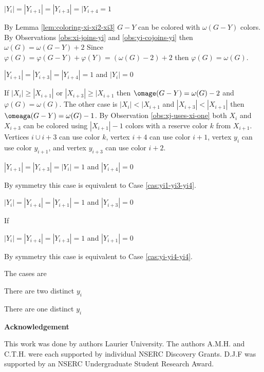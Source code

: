 \documentclass[12pt]{article}
\begin{document}
\begin{Case}\label{obs:four-yi} 
$|Y_i| = |Y_{i+1}| = |Y_{i+3}| = |Y_{i+4} =  1$
\end{Case}
 By Lemma \ref{lem:coloring-xi-xi2-xi3} $G - Y$ can be colored with $\omega(G - Y)$ colors. By Observations \ref{obs:xi-joins-yi} and \ref{obs:yi-cojoins-yi} then $\omega(G) = \omega(G - Y) + 2$ Since $\varphi(G) = \varphi(G - Y) + \varphi(Y) = (\omega(G) - 2) + 2$ then $\varphi(G) = \omega(G)$.

\begin{Case}\label{cas:yi1-yi3-yi4} 
$|Y_{i+1}| = |Y_{i+3}| =  |Y_{i+4}| = 1$ and $|Y_{i}| = 0$
\end{Case}
 If $|X_i| \geq |X_{i+1}|$ or $|X_{i+3}| \geq |X_{i+1}$ then $\omage(G - Y) = \omega(G) - 2$ and $\varphi(G) = \omega(G)$. The other case is $|X_i| < |X_{i+1}$ and $|X_{i+3}| < |X_{i+1}|$ then $\omeaga(G- Y) = \omega(G) - 1$. By Observation \ref{obs:xj-uses-xi-one} both $X_{i}$ and $X_{i+3}$ can be colored using $|X_{i+1}| - 1$ colors with a reserve color $k$ from $X_{i+1}$. Vertices $i \cup i+3$ can use color $k$, vertex $i+4$ can use color $i+1$, vertex $y_i$ can use color $y_{i+1}$, and vertex $y_{i+3}$ can use color $i+2$. 

\begin{Case}\label{cas:yi1-yi3-yi} 
$|Y_{i+1}| = |Y_{i+3}| =  |Y_{i}| = 1$ and $|Y_{i+4}| = 0$
\end{Case}
 By symmetry this case is equivalent to Case \ref{cas:yi1-yi3-yi4}.

\begin{Case}\label{cas:yi-yi4-yi1} 
$|Y_{i}| = |Y_{i+4}| =  |Y_{i+1}| = 1$ and $|Y_{i+3}| = 0$
\end{Case} If 

\begin{Case}\label{cas:yi-yi4-yi3} 
$|Y_{i}| = |Y_{i+4}| =  |Y_{i+3}| = 1$ and $|Y_{i+1}| = 0$
\end{Case}
 By symmetry this case is equivalent to Case \ref{cas:yi-yi4-yi4}.



 The cases are
\begin{Case}\label{cas:two-yi} 
There are two distinct $y_i$
\end{Case}

\begin{Case}\label{obs:one-yi} 
There are one distinct $y_i$
\end{Case}



\begin{center}
{\bf Acknowledgement}
\end{center}
This work was done by authors  Laurier University. The authors A.M.H. and C.T.H. were each supported by individual NSERC Discovery Grants. D.J.F was supported by an NSERC Undergraduate Student Research Award.


\clearpage
\begin{thebibliography}{99}

\end{thebibliography}
\end{document}
